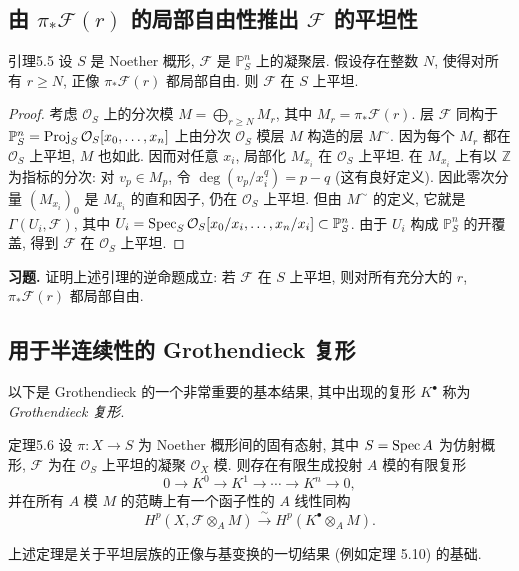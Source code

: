\subsection{\texorpdfstring{由 $\pi_*\mathcal F(r)$ 的局部自由性推出 $\mathcal F$ 的平坦性}{由正像的局部自由性推出平坦性}}\label{ch05:sec5.3.2}
\begin{origstatement}{引理}{5.5}\label{ch05:lem5.5}
设 $S$ 是 Noether 概形, $\mathcal F$ 是 $\mathbb P^n_S$ 上的凝聚层. 假设存在整数 $N$, 使得对所有 $r\geq N$, 正像 $\pi_*\mathcal F(r)$ 都局部自由. 则 $\mathcal F$ 在 $S$ 上平坦.
\end{origstatement}
\begin{proof}
考虑 $\mathcal O_S$ 上的分次模 $M=\bigoplus_{r\geq N}M_r$, 其中 $M_r=\pi_*\mathcal F(r)$. 层 $\mathcal F$ 同构于 $\mathbb P^n_S=\operatorname{Proj}_S\mathcal O_S[x_0,\ldots,x_n]$ 上由分次 $\mathcal O_S$ 模层 $M$ 构造的层 $M^\sim$. 因为每个 $M_r$ 都在 $\mathcal O_S$ 上平坦, $M$ 也如此. 因而对任意 $x_i$, 局部化 $M_{x_i}$ 在 $\mathcal O_S$ 上平坦. 在 $M_{x_i}$ 上有以 $\mathbb Z$ 为指标的分次: 对 $v_p\in M_p$, 令 $\deg(v_p/x_i^q)=p-q$ (这有良好定义). 因此零次分量 $(M_{x_i})_0$ 是 $M_{x_i}$ 的直和因子, 仍在 $\mathcal O_S$ 上平坦. 但由 $M^\sim$ 的定义, 它就是 $\Gamma(U_i,\mathcal F)$, 其中 $U_i=\operatorname{Spec}_S\mathcal O_S[x_0/x_i,\ldots,x_n/x_i]\subset\mathbb P^n_S$. 由于 $U_i$ 构成 $\mathbb P^n_S$ 的开覆盖, 得到 $\mathcal F$ 在 $\mathcal O_S$ 上平坦.
\end{proof}

\textbf{习题.} 证明上述引理的逆命题成立: 若 $\mathcal F$ 在 $S$ 上平坦, 则对所有充分大的 $r$, $\pi_*\mathcal F(r)$ 都局部自由.

\subsection{用于半连续性的 Grothendieck 复形}\label{ch05:sec5.3.3}
以下是 Grothendieck 的一个非常重要的基本结果, 其中出现的复形 $K^\bullet$ 称为 \emph{Grothendieck 复形}.

\begin{origstatement}{定理}{5.6}\label{ch05:thm5.6}
设 $\pi:X\to S$ 为 Noether 概形间的固有态射, 其中 $S=\operatorname{Spec} A$ 为仿射概形, $\mathcal F$ 为在 $\mathcal O_S$ 上平坦的凝聚 $\mathcal O_X$ 模. 则存在有限生成投射 $A$ 模的有限复形
\[
 0\longrightarrow K^0\longrightarrow K^1\longrightarrow\cdots\longrightarrow K^n\longrightarrow0,
\]
并在所有 $A$ 模 $M$ 的范畴上有一个函子性的 $A$ 线性同构
\[
 H^p(X,\mathcal F\otimes_A M)\xrightarrow{\sim}H^p(K^\bullet\otimes_A M).
\]
\end{origstatement}
上述定理是关于平坦层族的正像与基变换的一切结果 (例如定理 5.10) 的基础.

